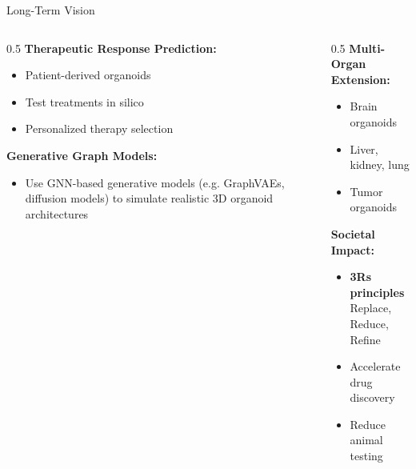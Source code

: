 \documentclass[aspectratio=169]{beamer}
\begin{document}
\begin{frame}{Long-Term Vision}
    \begin{columns}
        \begin{column}{0.5\textwidth}
            \textbf{Therapeutic Response Prediction:}
            \begin{itemize}
                \item Patient-derived organoids
                \item Test treatments in silico
                \item Personalized therapy selection
            \end{itemize}
            
            \vspace{0.5em}
            \textbf{Generative Graph Models:}
            \begin{itemize}
                \item Use GNN-based generative models (e.g. GraphVAEs, diffusion models) to simulate realistic 3D organoid architectures
            \end{itemize}
        \end{column}
        \begin{column}{0.5\textwidth}
            \textbf{Multi-Organ Extension:}
            \begin{itemize}
                \item Brain organoids
                \item Liver, kidney, lung
                \item Tumor organoids
            \end{itemize}
            
            \vspace{0.5em}
            \textbf{Societal Impact:}
            \begin{itemize}
                \item \textbf{3Rs principles}\\{\footnotesize Replace, Reduce, Refine}
                \item Accelerate drug discovery
                \item Reduce animal testing
            \end{itemize}
        \end{column}
    \end{columns}
\end{frame}
\end{document}
